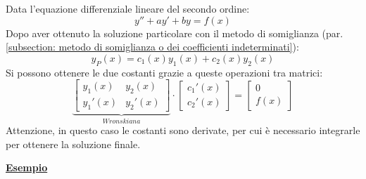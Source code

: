 \documentclass[a4paper]{article}
\newcommand{\example}[1]{\textcolor{Green4}{\textbf{#1}}}
\begin{document}
	\noindent
	Data l'equazione differenziale lineare del secondo ordine:
	\begin{equation*}
		y'' + ay' + by = f\left(x\right)
	\end{equation*}
	Dopo aver ottenuto la soluzione particolare con il metodo di somiglianza (par. \ref{subsection: metodo di somiglianza o dei coefficienti indeterminati}):
	\begin{equation*}
		y_{P}\left(x\right) = c_{1}\left(x\right)y_{1}\left(x\right) + c_{2}\left(x\right) y_{2}\left(x\right)
	\end{equation*}
	Si possono ottenere le due costanti grazie a queste operazioni tra matrici:
	\begin{equation*}
		\underbrace{
			\begin{bmatrix}
				y_{1}\left(x\right) & y_{2}\left(x\right) \\
				y_{1}'\left(x\right) & y_{2}'\left(x\right)
			\end{bmatrix}
		}_{Wronskiana}
		\cdot
		\begin{bmatrix}
			c_{1}'\left(x\right) \\
			c_{2}'\left(x\right)
		\end{bmatrix}
		=
		\begin{bmatrix}
			0 \\
			f\left(x\right)
		\end{bmatrix}
	\end{equation*}
	Attenzione, in questo caso le costanti sono derivate, per cui è necessario integrarle per ottenere la soluzione finale.

	\begin{flushleft}
		\example{\underline{\textbf{Esempio}}}
	\end{flushleft}
\end{document}
